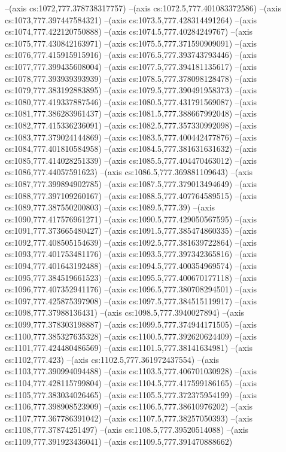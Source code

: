 --(axis cs:1072,777.378738317757)
--(axis cs:1072.5,777.401083372586)
--(axis cs:1073,777.397447584321)
--(axis cs:1073.5,777.428314491264)
--(axis cs:1074,777.422120750888)
--(axis cs:1074.5,777.40284249767)
--(axis cs:1075,777.430842163971)
--(axis cs:1075.5,777.371590909091)
--(axis cs:1076,777.415915915916)
--(axis cs:1076.5,777.393743793446)
--(axis cs:1077,777.399435608004)
--(axis cs:1077.5,777.394181135617)
--(axis cs:1078,777.393939393939)
--(axis cs:1078.5,777.378098128478)
--(axis cs:1079,777.383192883895)
--(axis cs:1079.5,777.390491958373)
--(axis cs:1080,777.419337887546)
--(axis cs:1080.5,777.431791569087)
--(axis cs:1081,777.386283961437)
--(axis cs:1081.5,777.388667992048)
--(axis cs:1082,777.415336236091)
--(axis cs:1082.5,777.357330992098)
--(axis cs:1083,777.379024144869)
--(axis cs:1083.5,777.400442477876)
--(axis cs:1084,777.401810584958)
--(axis cs:1084.5,777.381631631632)
--(axis cs:1085,777.414028251339)
--(axis cs:1085.5,777.404470463012)
--(axis cs:1086,777.44057591623)
--(axis cs:1086.5,777.369881109643)
--(axis cs:1087,777.399894902785)
--(axis cs:1087.5,777.379013494649)
--(axis cs:1088,777.397109260167)
--(axis cs:1088.5,777.407764589515)
--(axis cs:1089,777.387550200803)
--(axis cs:1089.5,777.39)
--(axis cs:1090,777.417576961271)
--(axis cs:1090.5,777.429050567595)
--(axis cs:1091,777.373665480427)
--(axis cs:1091.5,777.385474860335)
--(axis cs:1092,777.408505154639)
--(axis cs:1092.5,777.381639722864)
--(axis cs:1093,777.401753481176)
--(axis cs:1093.5,777.397342365816)
--(axis cs:1094,777.401643192488)
--(axis cs:1094.5,777.400354969574)
--(axis cs:1095,777.384519661523)
--(axis cs:1095.5,777.400670177118)
--(axis cs:1096,777.407352941176)
--(axis cs:1096.5,777.380708294501)
--(axis cs:1097,777.425875397908)
--(axis cs:1097.5,777.384515119917)
--(axis cs:1098,777.37988136431)
--(axis cs:1098.5,777.3940027894)
--(axis cs:1099,777.378303198887)
--(axis cs:1099.5,777.374944171505)
--(axis cs:1100,777.385327635328)
--(axis cs:1100.5,777.392620624409)
--(axis cs:1101,777.424480486569)
--(axis cs:1101.5,777.38141634981)
--(axis cs:1102,777.423)
--(axis cs:1102.5,777.361972437554)
--(axis cs:1103,777.390994094488)
--(axis cs:1103.5,777.406701030928)
--(axis cs:1104,777.428115799804)
--(axis cs:1104.5,777.417599186165)
--(axis cs:1105,777.383034026465)
--(axis cs:1105.5,777.372375954199)
--(axis cs:1106,777.398908523909)
--(axis cs:1106.5,777.38610976202)
--(axis cs:1107,777.367786391042)
--(axis cs:1107.5,777.38257050393)
--(axis cs:1108,777.37874251497)
--(axis cs:1108.5,777.39520514088)
--(axis cs:1109,777.391923436041)
--(axis cs:1109.5,777.391470888662)
